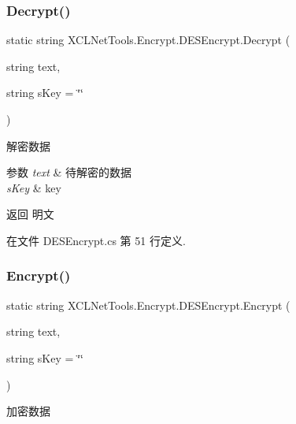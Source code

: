 \subsubsection{\texorpdfstring{Decrypt()}{Decrypt()}}
{\footnotesize\ttfamily static string X\+C\+L\+Net\+Tools.\+Encrypt.\+D\+E\+S\+Encrypt.\+Decrypt (\begin{DoxyParamCaption}\item[{string}]{text,  }\item[{string}]{s\+Key = {\ttfamily \char`\"{}\char`\"{}} }\end{DoxyParamCaption})\hspace{0.3cm}{\ttfamily [static]}}



解密数据 


\begin{DoxyParams}{参数}
{\em text} & 待解密的数据\\
\hline
{\em s\+Key} & key\\
\hline
\end{DoxyParams}
\begin{DoxyReturn}{返回}
明文
\end{DoxyReturn}


在文件 D\+E\+S\+Encrypt.\+cs 第 51 行定义.

\mbox{\label{class_x_c_l_net_tools_1_1_encrypt_1_1_d_e_s_encrypt_a5bd946e26e2f43cc6b2d999df6b9d88d}} 
\subsubsection{\texorpdfstring{Encrypt()}{Encrypt()}}
{\footnotesize\ttfamily static string X\+C\+L\+Net\+Tools.\+Encrypt.\+D\+E\+S\+Encrypt.\+Encrypt (\begin{DoxyParamCaption}\item[{string}]{text,  }\item[{string}]{s\+Key = {\ttfamily \char`\"{}\char`\"{}} }\end{DoxyParamCaption})\hspace{0.3cm}{\ttfamily [static]}}



加密数据 


